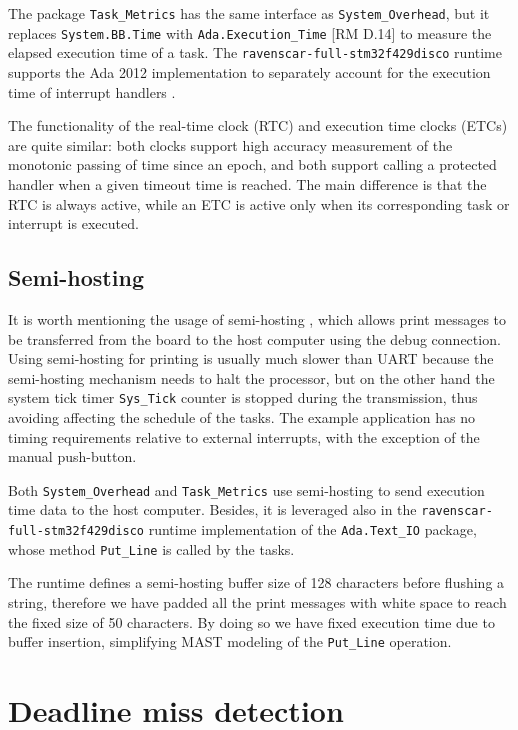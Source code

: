 \documentclass{article}
\begin{document}
The package \texttt{Task\_Metrics} has the same interface as \texttt{System\_Overhead}, but it replaces \texttt{System.BB.Time} with \texttt{Ada.Execution\_Time} [RM D.14] to measure the elapsed execution time of a task. The \texttt{ravenscar-full-stm32f429disco} runtime supports the Ada 2012 implementation to separately account for the execution time of interrupt handlers \cite{etc}.

The functionality of the real-time clock (RTC) and execution time clocks (ETCs) are quite similar: both clocks support high accuracy measurement of the monotonic passing of time since an epoch, and both support calling a protected handler when a given timeout time is reached. The main difference is that the RTC is always active, while an ETC is active only when its corresponding task or interrupt is executed.

\subsection{Semi-hosting}

It is worth mentioning the usage of semi-hosting \cite{semihosting}, which allows print messages to be transferred from the board to the host computer using the debug connection. Using semi-hosting for printing is usually much slower than UART because the semi-hosting mechanism needs to halt the processor, but on the other hand the system tick timer \texttt{Sys\_Tick} counter is stopped during the transmission, thus avoiding affecting the schedule of the tasks. The example application has no timing requirements relative to external interrupts, with the exception of the manual push-button.

Both \texttt{System\_Overhead} and \texttt{Task\_Metrics} use semi-hosting to send execution time data to the host computer. Besides, it is leveraged also in the \texttt{ravenscar-full-stm32f429disco} runtime implementation of the \texttt{Ada.Text\_IO} package, whose method \texttt{Put\_Line} is called by the tasks.

The runtime defines a semi-hosting buffer size of 128 characters before flushing a string, therefore we have padded all the print messages with white space to reach the fixed size of 50 characters. By doing so we have fixed execution time due to buffer insertion, simplifying MAST modeling of the \texttt{Put\_Line} operation.

\section{Deadline miss detection}
\end{document}
